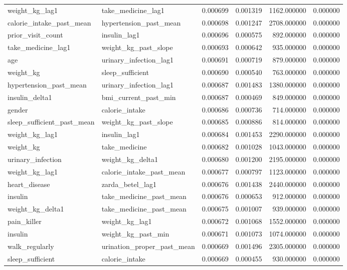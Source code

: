 \begin{longtable}{llrrrr}
weight\_kg\_lag1 & take\_medicine\_lag1 & 0.000699 & 0.001319 & 1162.000000 & 0.000000 \\
calorie\_intake\_past\_mean & hypertension\_past\_mean & 0.000698 & 0.001247 & 2708.000000 & 0.000000 \\
prior\_visit\_count & insulin\_lag1 & 0.000696 & 0.000575 & 892.000000 & 0.000000 \\
take\_medicine\_lag1 & weight\_kg\_past\_slope & 0.000693 & 0.000642 & 935.000000 & 0.000000 \\
age & urinary\_infection\_lag1 & 0.000691 & 0.000719 & 879.000000 & 0.000000 \\
weight\_kg & sleep\_sufficient & 0.000690 & 0.000540 & 763.000000 & 0.000000 \\
hypertension\_past\_mean & urinary\_infection\_lag1 & 0.000687 & 0.001483 & 1380.000000 & 0.000000 \\
insulin\_delta1 & bmi\_current\_past\_min & 0.000687 & 0.000469 & 849.000000 & 0.000000 \\
gender & calorie\_intake & 0.000686 & 0.000736 & 714.000000 & 0.000000 \\
sleep\_sufficient\_past\_mean & weight\_kg\_past\_slope & 0.000685 & 0.000886 & 814.000000 & 0.000000 \\
weight\_kg\_lag1 & insulin\_lag1 & 0.000684 & 0.001453 & 2290.000000 & 0.000000 \\
weight\_kg & take\_medicine & 0.000682 & 0.001028 & 1043.000000 & 0.000000 \\
urinary\_infection & weight\_kg\_delta1 & 0.000680 & 0.001200 & 2195.000000 & 0.000000 \\
weight\_kg\_lag1 & calorie\_intake\_past\_mean & 0.000677 & 0.000797 & 1123.000000 & 0.000000 \\
heart\_disease & zarda\_betel\_lag1 & 0.000676 & 0.001438 & 2440.000000 & 0.000000 \\
insulin & take\_medicine\_past\_mean & 0.000676 & 0.000653 & 912.000000 & 0.000000 \\
weight\_kg\_delta1 & take\_medicine\_past\_mean & 0.000675 & 0.001007 & 939.000000 & 0.000000 \\
pain\_killer & weight\_kg\_lag1 & 0.000672 & 0.001068 & 1552.000000 & 0.000000 \\
insulin & weight\_kg\_past\_min & 0.000671 & 0.001073 & 1074.000000 & 0.000000 \\
walk\_regularly & urination\_proper\_past\_mean & 0.000669 & 0.001496 & 2305.000000 & 0.000000 \\
sleep\_sufficient & calorie\_intake & 0.000669 & 0.000455 & 930.000000 & 0.000000 \\

\end{longtable}
